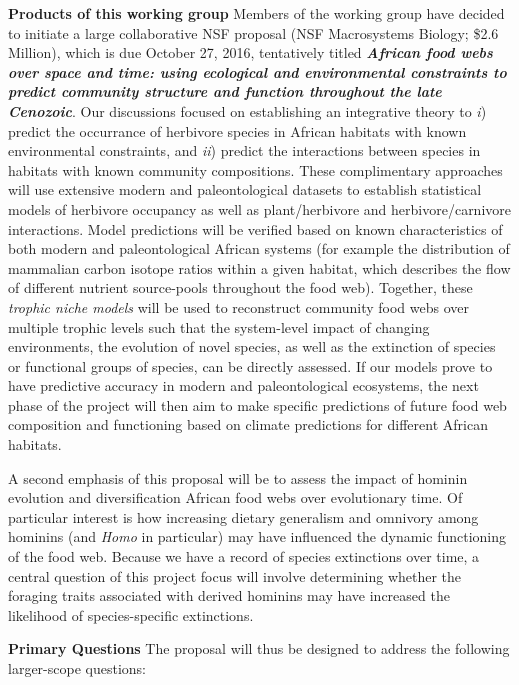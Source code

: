 \documentclass{article}[10pt]
\begin{document}
{\bf Products of this working group} Members of the working group have decided to initiate a large collaborative NSF proposal (NSF Macrosystems Biology; \$2.6 Million), which is due October 27, 2016, tentatively titled {\bf \emph{African food webs over space and time: using ecological and environmental constraints to predict community structure and function throughout the late Cenozoic}}.
Our discussions focused on establishing an integrative theory to \emph{i}) predict the occurrance of herbivore species in African habitats with known environmental constraints, and \emph{ii}) predict the interactions between species in habitats with known community compositions.
These complimentary approaches will use extensive modern and paleontological datasets to establish statistical models of herbivore occupancy as well as plant/herbivore and herbivore/carnivore interactions.
Model predictions will be verified based on known characteristics of both modern and paleontological African systems (for example the distribution of mammalian carbon isotope ratios within a given habitat, which describes the flow of different nutrient source-pools throughout the food web).
Together, these \emph{trophic niche models} will be used to reconstruct community food webs over multiple trophic levels such that the system-level impact of changing environments, the evolution of novel species, as well as the extinction of species or functional groups of species, can be directly assessed.
If our models prove to have predictive accuracy in modern and paleontological ecosystems, the next phase of the project will then aim to make specific predictions of future food web composition and functioning based on  climate predictions for different African habitats.

A second emphasis of this proposal will be to assess the impact of hominin evolution and diversification African food webs over evolutionary time.
Of particular interest is how increasing dietary generalism and omnivory among hominins (and \emph{Homo} in particular) may have influenced the dynamic functioning of the food web.
Because we have a record of species extinctions over time, a central question of this project focus will involve determining whether the foraging traits associated with derived hominins may have increased the likelihood of species-specific extinctions.

\vspace{5 mm}

{\bf Primary Questions} The proposal will thus be designed to address the following larger-scope questions:
\end{document}
